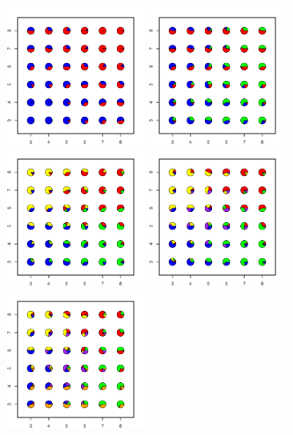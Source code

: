 \documentclass[12pt]{article}
\begin{document}
\newpage
\begin{figure}
	\centering
			{\includegraphics[width=1.8in,height=1.8in]{figs/sims/simK1_nsp_pies_K2.pdf}}
			{\includegraphics[width=1.8in,height=1.8in]{figs/sims/simK1_nsp_pies_K3.pdf}}
			{\includegraphics[width=1.8in,height=1.8in]{figs/sims/simK1_nsp_pies_K4.pdf}}
			{\includegraphics[width=1.8in,height=1.8in]{figs/sims/simK1_nsp_pies_K5.pdf}}
			{\includegraphics[width=1.8in,height=1.8in]{figs/sims/simK1_nsp_pies_K6.pdf}}

\end{figure}
\end{document}
